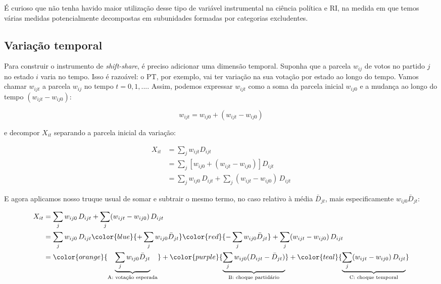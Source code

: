 \documentclass[
]{article}
\begin{document}
É curioso que não tenha havido maior utilização desse tipo de variável instrumental na ciência política e RI, na medida em que temos várias medidas potencialmente decompostas em subunidades formadas por categorias excludentes.

\subsection{Variação temporal}\label{variauxe7uxe3o-temporal}

Para construir o instrumento de \emph{shift-share}, é preciso adicionar uma dimensão temporal. Suponha que a parcela \(w_{ij}\) de votos no partido \(j\) no estado \(i\) varia no tempo. Isso é razoável: o PT, por exemplo, vai ter variação na sua votação por estado ao longo do tempo. Vamos chamar \(w_{ijt}\) a parcela \(w_{ij}\) no tempo \(t=0, 1, ...\). Assim, podemos expressar \(w_{ijt}\) como a soma da parcela inicial \(w_{ij0}\) e a mudança ao longo do tempo \((w_{ijt} - w_{ij0})\):

\[w_{ijt} = w_{ij0} + (w_{ijt} - w_{ij0})\]

e decompor \(X_{it}\) separando a parcela inicial da variação:

\begin{equation}
\begin{aligned}
X_{it} &= \sum_j w_{ijt}D_{ijt} \\
       &= \sum_j \left[w_{ij0} + (w_{ijt} - w_{ij0})\right] D_{ijt} \\
       &= \sum_j w_{ij0} \, D_{ijt} + \sum_j (w_{ijt} - w_{ij0}) \, D_{ijt}
\end{aligned}
\label{eq:ss-temporal1}
\end{equation}

E agora aplicamos nosso truque usual de somar e subtrair o mesmo termo, no caso relativo à média \(\bar{D}_{jt}\), mais especificamente \(w_{ij0}\bar{D}_{jt}\):

\begin{equation}
\begin{aligned}
X_{it} &= \sum_j w_{ij0} \, D_{ijt} + \sum_j (w_{ijt} - w_{ij0}) \, D_{ijt} \\
       &= \sum_j w_{ij0} \, D_{ijt} \color{blue}{+ \sum_j w_{ij0}\bar{D}_{jt}} \color{red}{- \sum_j w_{ij0}\bar{D}_{jt}} + \sum_j (w_{ijt} - w_{ij0}) \, D_{ijt} \\
       &= \color{orange}{\underbrace{\sum_j w_{ij0}\bar{D}_{jt}}_{\text{A: votação esperada}}} + \color{purple}{\underbrace{\sum_j w_{ij0}(D_{ijt} - \bar{D}_{jt})}_{\text{B: choque partidário}}} + \color{teal}{\underbrace{\sum_j (w_{ijt} - w_{ij0}) \, D_{ijt}}_{\text{C: choque temporal}}}
\end{aligned}
\label{eq:ss-temporal-abc}
\end{equation}
\end{document}
